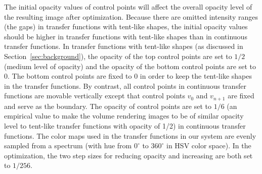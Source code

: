 
The initial opacity values of control points will affect the overall opacity level of the resulting image after optimization. Because there are omitted intensity ranges (the gaps) in transfer functions with tent-like shapes, the initial opacity values should be higher in transfer functions with tent-like shapes than in continuous transfer functions.
In transfer functions with tent-like shapes (as discussed in Section~\ref{sec:background}), the opacity of the top control points are set to $ 1/2 $ (medium level of opacity) and the opacity of the bottom control points are set to 0. The bottom control points are fixed to 0 in order to keep the tent-like shapes in the transfer functions. By contrast, all control points in continuous transfer functions are movable vertically except that control points $ v_{0} $ and $ v_{n+1} $ are fixed and serve as the boundary. The opacity of control points are set to $ 1/6 $ (an empirical value to make the volume rendering images to be of similar opacity level to tent-like transfer functions with opacity of 1/2) in continuous transfer functions.
The color maps used in the transfer functions in our system are evenly sampled from a spectrum (with hue from $ 0^\circ $ to $ 360^\circ $ in HSV color space).
In the optimization, the two step sizes for reducing opacity and increasing are both set to $ 1/256 $.

